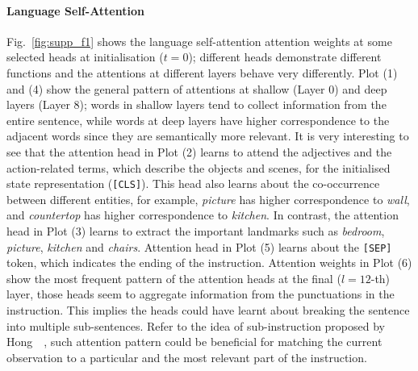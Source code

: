 \documentclass[final]{cvpr}
\begin{document}
\paragraph{Language Self-Attention}
Fig.~\ref{fig:supp_f1} shows the language self-attention attention weights at some selected heads at initialisation ($t{=}0$); different heads demonstrate different functions and the attentions at different layers behave very differently. Plot (1) and (4) show the general pattern of attentions at shallow (Layer 0) and deep layers (Layer 8); words in shallow layers tend to collect information from the entire sentence, while words at deep layers have higher correspondence to the adjacent words since they are semantically more relevant. It is very interesting to see that the attention head in Plot (2) learns to attend the adjectives and the action-related terms, which describe the objects and scenes, for the initialised state representation (\texttt{[CLS]}). This head also learns about the co-occurrence between different entities, for example, \textit{picture} has higher correspondence to \textit{wall}, and \textit{countertop} has higher correspondence to \textit{kitchen}. In contrast, the attention head in Plot (3) learns to extract the important landmarks such as \textit{bedroom}, \textit{picture}, \textit{kitchen} and \textit{chairs}. Attention head in Plot (5) learns about the \texttt{[SEP]} token, which indicates the ending of the instruction. Attention weights in Plot (6) show the most frequent pattern of the attention heads at the final ($l{=}12$-th) layer, those heads seem to aggregate information from the punctuations in the instruction. This implies the heads could have learnt about breaking the sentence into multiple sub-sentences. Refer to the idea of sub-instruction proposed by Hong~\etal~\cite{hong-etal-2020-sub}, such attention pattern could be beneficial for matching the current observation to a particular and the most relevant part of the instruction.
\end{document}
